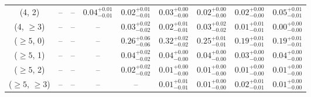 \begin{table}[h!]
{\begin{tabular}{ccccccccc}
	(4, 2) & -- & -- & $0.04^{+ 0.01 }_{- 0.01 }$ & $0.02^{+ 0.01 }_{- 0.01 }$ & $0.03^{+ 0.00 }_{- 0.00 }$ & $0.02^{+ 0.00 }_{- 0.00 }$ & $0.02^{+ 0.00 }_{- 0.00 }$ & $0.05^{+ 0.01 }_{- 0.01 }$ \\[0.5ex] 
	(4, $\ge3$) & -- & -- & -- & $0.03^{+ 0.02 }_{- 0.02 }$ & $0.02^{+ 0.01 }_{- 0.01 }$ & $0.03^{+ 0.02 }_{- 0.02 }$ & $0.01^{+ 0.01 }_{- 0.01 }$ & $0.00^{+ 0.00 }_{- 0.00 }$ \\[0.5ex] 
	($\ge5$, 0) & -- & -- & -- & $0.26^{+ 0.06 }_{- 0.06 }$ & $0.32^{+ 0.02 }_{- 0.02 }$ & $0.25^{+ 0.01 }_{- 0.01 }$ & $0.19^{+ 0.01 }_{- 0.01 }$ & $0.19^{+ 0.01 }_{- 0.01 }$ \\[0.5ex] 
	($\ge5$, 1) & -- & -- & -- & $0.04^{+ 0.02 }_{- 0.02 }$ & $0.04^{+ 0.00 }_{- 0.00 }$ & $0.04^{+ 0.00 }_{- 0.00 }$ & $0.03^{+ 0.00 }_{- 0.00 }$ & $0.04^{+ 0.00 }_{- 0.00 }$ \\[0.5ex] 
	($\ge5$, 2) & -- & -- & -- & $0.02^{+ 0.02 }_{- 0.02 }$ & $0.01^{+ 0.00 }_{- 0.00 }$ & $0.01^{+ 0.00 }_{- 0.00 }$ & $0.01^{+ 0.00 }_{- 0.00 }$ & $0.01^{+ 0.00 }_{- 0.00 }$ \\[0.5ex] 
	($\ge5$, $\ge3$) & -- & -- & -- & -- & $0.01^{+ 0.01 }_{- 0.01 }$ & $0.01^{+ 0.00 }_{- 0.00 }$ & $0.02^{+ 0.01 }_{- 0.01 }$ & $0.01^{+ 0.00 }_{- 0.00 }$ \\[0.5ex] 
	\hline
	\hline
\end{tabular}}
\end{table}
